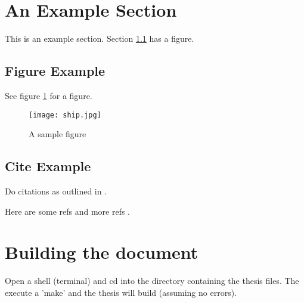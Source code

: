 
\section{An Example Section}
This is an example section.  Section \ref{subfigure}
has a figure.

\subsection{Figure Example}
\label{subfigure}
See figure \ref{ship} for a figure.

\begin{figure}[ht]
\centering
\texttt{[image: ship.jpg]}
\caption{A sample figure
	 \label{ship}} 
\end{figure}

\subsection{Cite Example}
Do citations as outlined in \cite{bibref}.

Here are some refs \cite{bishop} and more refs \cite{tanev:2004:ALR,aarts:1989:sa}.

\section{Building the document}

Open a shell (terminal) and cd into the directory containing the thesis files.  The execute a 'make' and the thesis will build (assuming no errors).
